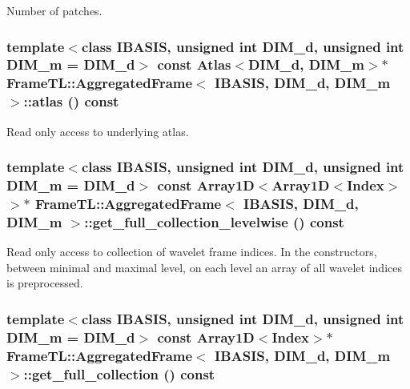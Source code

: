 Number of patches. \hypertarget{classFrameTL_1_1AggregatedFrame_ae0fa43f9093358f1ae2fdda963330a8}{
\subsubsection[atlas]{\setlength{\rightskip}{0pt plus 5cm}template$<$class IBASIS, unsigned int DIM\_\-d, unsigned int DIM\_\-m = DIM\_\-d$>$ const Atlas$<$DIM\_\-d, DIM\_\-m$>$$\ast$ {\bf FrameTL::AggregatedFrame}$<$ IBASIS, DIM\_\-d, DIM\_\-m $>$::atlas () const}}
\label{classFrameTL_1_1AggregatedFrame_ae0fa43f9093358f1ae2fdda963330a8}


Read only access to underlying atlas. \hypertarget{classFrameTL_1_1AggregatedFrame_a497fe15ea8ef7cb83e639c94ba38143}{
\subsubsection[get\_\-full\_\-collection\_\-levelwise]{\setlength{\rightskip}{0pt plus 5cm}template$<$class IBASIS, unsigned int DIM\_\-d, unsigned int DIM\_\-m = DIM\_\-d$>$ const Array1D$<$Array1D$<${\bf Index}$>$ $>$$\ast$ {\bf FrameTL::AggregatedFrame}$<$ IBASIS, DIM\_\-d, DIM\_\-m $>$::get\_\-full\_\-collection\_\-levelwise () const}}
\label{classFrameTL_1_1AggregatedFrame_a497fe15ea8ef7cb83e639c94ba38143}


Read only access to collection of wavelet frame indices. In the constructors, between minimal and maximal level, on each level an array of all wavelet indices is preprocessed. \hypertarget{classFrameTL_1_1AggregatedFrame_ed621690c6ba7da23caa1f50a34167a5}{
\subsubsection[get\_\-full\_\-collection]{\setlength{\rightskip}{0pt plus 5cm}template$<$class IBASIS, unsigned int DIM\_\-d, unsigned int DIM\_\-m = DIM\_\-d$>$ const Array1D$<${\bf Index}$>$$\ast$ {\bf FrameTL::AggregatedFrame}$<$ IBASIS, DIM\_\-d, DIM\_\-m $>$::get\_\-full\_\-collection () const}}
\label{classFrameTL_1_1AggregatedFrame_ed621690c6ba7da23caa1f50a34167a5}



